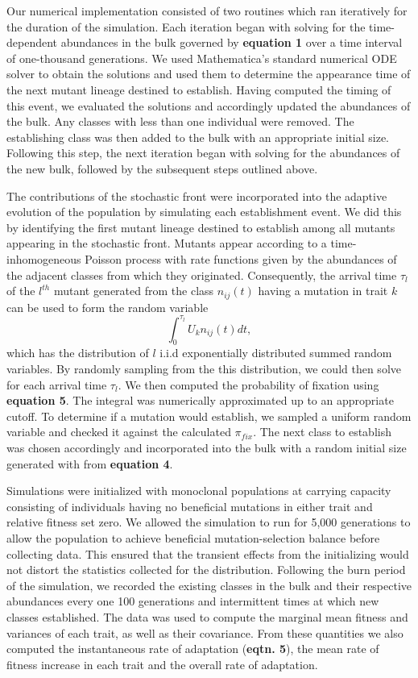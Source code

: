 \documentclass[9pt,twocolumn,twoside]{gsajnl}
\begin{document}
Our numerical implementation consisted of two routines which ran iteratively for the duration of the simulation. Each iteration began with solving for the time-dependent abundances in the bulk governed by \textbf{equation 1} over a time interval of one-thousand generations. We used Mathematica's standard numerical ODE solver to obtain the solutions and used them to determine the appearance time of the next mutant lineage destined to establish. Having computed the timing of this event, we evaluated the solutions and accordingly updated the abundances of the bulk. Any classes with less than one individual were removed.  The establishing class was then added to the bulk with an appropriate initial size. Following this step, the next iteration began with solving for the abundances of the new bulk, followed by the subsequent steps outlined above.\par

The contributions of the stochastic front were incorporated into the adaptive evolution of the population by simulating each establishment event.  We did this by identifying the first mutant lineage destined to establish among all mutants appearing in the stochastic front.  Mutants appear according to a time-inhomogeneous Poisson process with rate functions given by the abundances of the adjacent classes from which they originated. Consequently, the arrival time $\tau_l$ of the $l^{th}$ mutant generated from the class $n_{ij}(t)$ having a mutation in trait $k$ can be used to form the random variable
\[ 
\int_0^{\tau_l} U_k n_{ij}(t) dt ,
\] 
which has the distribution of $l$ i.i.d exponentially distributed summed random variables. By randomly sampling from the this distribution, we could then solve for each arrival time $\tau_l$.   We then computed the probability of fixation using \textbf{equation 5}.  The integral was numerically approximated up to an appropriate cutoff.  To determine if a mutation would establish, we sampled a uniform random variable and checked it against the calculated $\pi_{fix}$. The next class to establish was chosen accordingly and incorporated into the bulk with a random initial size generated with from \textbf{equation 4}.\par

Simulations were initialized with monoclonal populations at carrying capacity consisting of individuals having no beneficial mutations in either trait and relative fitness set zero. We allowed the simulation to run for 5,000 generations to allow the population to achieve beneficial mutation-selection balance before collecting data. This ensured that the transient effects from the initializing would not distort the statistics collected for the distribution. Following the burn period of the simulation, we recorded the existing classes in the bulk and their respective abundances every one 100 generations and intermittent times at which new classes established. The data was used to compute the marginal mean fitness and variances of each trait, as well as their covariance. From these quantities we also computed the instantaneous rate of adaptation (\textbf{eqtn. 5}), the mean rate of fitness increase in each trait and the overall rate of adaptation.
\end{document}
